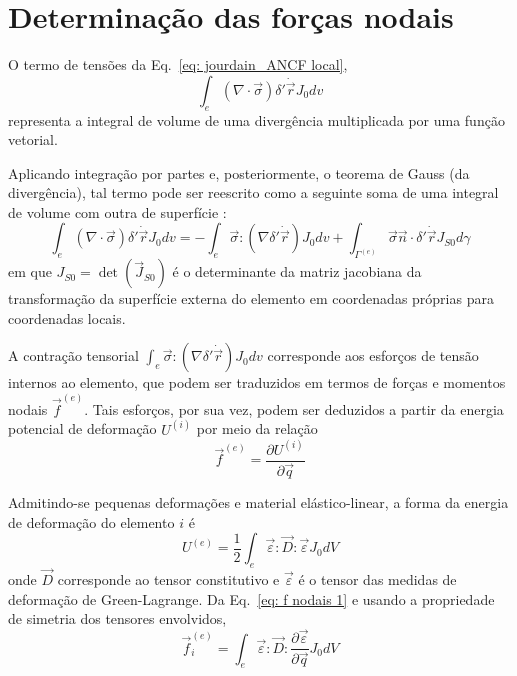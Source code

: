 \section{Determinação das forças nodais}
O termo de tensões da Eq.~\eqref{eq: jourdain_ANCF local},
\begin{equation}
    \int_{e}{\left(\nabla{}\cdot\vec{\sigma}\right) \delta'\dot{\vec{r}} J_0 dv}
\end{equation}
representa a integral de volume de uma divergência multiplicada por uma função vetorial.

Aplicando integração por partes e, posteriormente, o teorema de Gauss (da divergência), tal termo pode ser reescrito como
a seguinte soma de uma integral de volume com outra de superfície \cite{hughes_finite_2000,bittencourt_computational_2015}:
\begin{equation}
    \int_{e}{\left(\nabla{}\cdot\vec{\sigma}\right) \delta'\dot{\vec{r}} J_0 dv}=
    - \int_{e}{\vec{\sigma}:\left(\nabla{\delta'\dot{\vec{r}}}\right) J_0 dv} +
    \int_{\Gamma^{(e)}}{\vec{\sigma}\vec{n} \cdot \delta'\dot{\vec{r}} J_{S0} d\gamma} \label{eq: tensoes integral}
\end{equation}
em que $J_{S0} = \det(\vec{J}_{S0})$ é o determinante da matriz jacobiana da transformação da superfície externa do
elemento em coordenadas próprias para coordenadas locais.

A contração tensorial $\int_{e}{\vec{\sigma}:\left(\nabla{\delta'\dot{\vec{r}}}\right) J_0 dv}$ corresponde aos esforços de tensão
internos ao elemento, que podem ser traduzidos em termos de forças e momentos nodais $\vec{f}^{(e)}$. Tais esforços, por sua vez, 
podem ser deduzidos a partir da energia potencial de deformação $U^{(i)}$ por meio da relação
\begin{equation}
    \vec{f}^{(e)} = \frac{\partial U^{(i)}}{\partial \vec{q}} \label{eq: f nodais 1}
\end{equation}

Admitindo-se pequenas deformações e material elástico-linear, a forma da energia de deformação do elemento $i$ é
\begin{equation}
    U^{(e)} = \frac{1}{2} \int_{e} {\vec{\varepsilon}:\vec{D}:\vec{\varepsilon} J_0 dV}
\end{equation}
onde $\vec{D}$ corresponde ao tensor constitutivo e $\vec{\varepsilon}$ é o tensor das medidas de deformação de Green-Lagrange.
Da Eq.~\eqref{eq: f nodais 1} e usando a propriedade de simetria dos tensores envolvidos,
\begin{equation}
    \vec{f}_i^{(e)} = \int_{e} {\vec{\varepsilon}:\vec{D}:\frac{\partial \vec{\varepsilon}}{\partial \vec{q}} J_0 dV} \label{eq: f nodais 2}
\end{equation}

